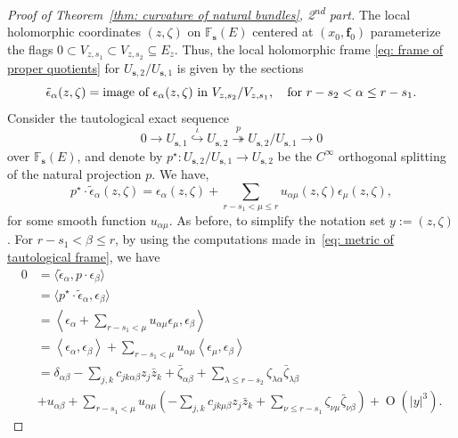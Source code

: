 \documentclass[a4paper]{amsart}
\theoremstyle{plain}%
\theoremstyle{definition}
\theoremstyle{remark}
\newcommand{\FF}{\mathbb{F}}
\begin{document}
\begin{proof}[Proof of Theorem~\ref{thm: curvature of natural bundles}, 2\textsuperscript{nd} part]
	The local holomorphic coordinates $ (z,\zeta) $ on $ \FF_{\mathbf{s}}(E) $ centered at $ (x_0,\mathbf{f}_0) $ parameterize the flags $ 0 \subset V_{z,s_1} \subset V_{z,s_2} \subseteq E_{z} $.
	Thus, the local holomorphic frame \eqref{eq: frame of proper quotients} for $ U_{\mathbf{s},2} / U_{\mathbf{s},1} $ is given by the sections
	\begin{equation*}
		\tilde{\epsilon}_\alpha (z,\zeta) = \text{image of $ \epsilon_\alpha(z,\zeta) $ in $ V_{z,s_2} / V_{z,s_1} $} , \quad \text{for} \ r-s_2 < \alpha \le r-s_1 .
	\end{equation*}
	Consider the tautological exact sequence
	\[
	0 \to U_{\mathbf{s},1} \overset{\iota}{\hookrightarrow} U_{\mathbf{s},2} \overset{p}{\twoheadrightarrow} U_{\mathbf{s},2} / U_{\mathbf{s},1} \to 0
	\]
	over $ \FF_{\mathbf{s}}(E) $, and denote by $ p^{\star} \colon U_{\mathbf{s},2} / U_{\mathbf{s},1} \to U_{\mathbf{s},2} $ be the $ C^{\infty} $ orthogonal splitting of the natural projection $ p $.
	We have,
	\begin{equation*}
		p^{\star} \cdot \tilde{\epsilon}_\alpha (z,\zeta) = \epsilon_\alpha(z,\zeta) + \sum_{r-s_1 < \mu \le r} u_{\alpha\mu}(z,\zeta) \epsilon_\mu(z,\zeta) ,
	\end{equation*}
	for some smooth function $ u_{\alpha\mu} $.
	As before, to simplify the notation set $ y := (z,\zeta) $.
	For $ r- s_1 < \beta \le r $, by using the computations made in~\eqref{eq: metric of tautological frame}, we have
	\begin{equation*}
		\begin{split}
			0 &= \langle \tilde{\epsilon}_\alpha, p \cdot \epsilon_\beta \rangle \\
			&= \langle p^{\star} \cdot \tilde{\epsilon}_\alpha, \epsilon_\beta \rangle \\
			&= \left< \epsilon_\alpha + \sum_{r-s_1 < \mu} u_{\alpha\mu} \epsilon_\mu, \epsilon_\beta  \right> \\
			&= \left< \epsilon_\alpha, \epsilon_\beta \right> +
			\sum_{r-s_1 < \mu} u_{\alpha\mu} \left< \epsilon_\mu, \epsilon_\beta \right> \\
			&= \delta_{\alpha\beta} - \sum_{j,k} c_{jk\alpha\beta} z_j \bar{z}_k + \bar{\zeta}_{\alpha\beta} + \sum_{\lambda \le r-s_2} \zeta_{\lambda\alpha} \bar{\zeta}_{\lambda\beta} \\
			&+ u_{\alpha\beta} + \sum_{r-s_1 < \mu} u_{\alpha\mu}
			\left( - \sum_{j,k} c_{jk\mu\beta} z_j \bar{z}_k + \sum_{\nu \le r-s_1} \zeta_{\nu\mu} \bar{\zeta}_{\nu\beta} \right) + \operatorname{O}(|y|^3) .
		\end{split}
	\end{equation*}
	

\end{proof}
\end{document}
